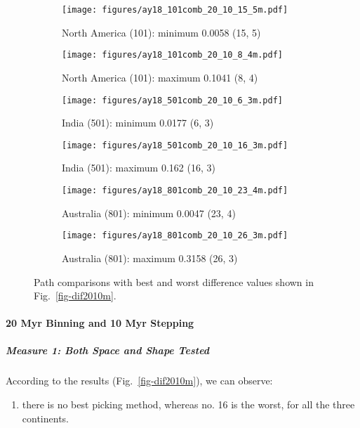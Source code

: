 \begin{figure*}
	\centering
	\begin{subfigure}{.43\textwidth}
		\texttt{[image: figures/ay18\_101comb\_20\_10\_15\_5m.pdf]}
		\caption{North America (101): minimum 0.0058 (15, 5)}\label{fig-nac-2010155m}
	\end{subfigure}
	\begin{subfigure}{.43\textwidth}
		\texttt{[image: figures/ay18\_101comb\_20\_10\_8\_4m.pdf]}
		\caption{North America (101): maximum 0.1041 (8, 4)}\label{fig-nac-201084m}
	\end{subfigure}
	\vspace{.1em}
	\begin{subfigure}{.43\textwidth}
		\texttt{[image: figures/ay18\_501comb\_20\_10\_6\_3m.pdf]}
		\caption{India (501): minimum 0.0177 (6, 3)}\label{fig-ind-201063m}
	\end{subfigure}
	\begin{subfigure}{.43\textwidth}
		\texttt{[image: figures/ay18\_501comb\_20\_10\_16\_3m.pdf]}
		\caption{India (501): maximum 0.162 (16, 3)}\label{fig-ind-2010163m}
	\end{subfigure}
	\vspace{.1em}
	\begin{subfigure}{.43\textwidth}
		\texttt{[image: figures/ay18\_801comb\_20\_10\_23\_4m.pdf]}
		\caption{Australia (801): minimum 0.0047 (23, 4)}\label{fig-au-2010234m}
	\end{subfigure}
	\begin{subfigure}{.43\textwidth}
		\texttt{[image: figures/ay18\_801comb\_20\_10\_26\_3m.pdf]}
		\caption{Australia (801): maximum 0.3158 (26, 3)}\label{fig-au-2010263m}
	\end{subfigure}
	\caption[Best and worst differences with test (20 Myr bin, 10 Myr
step)]{Path comparisons with best and worst difference values shown in
Fig.~\ref{fig-dif2010m}.}\label{fig-dif2010bwm}
\end{figure*}

\paragraph{20 Myr Binning and 10 Myr Stepping}

\subparagraph{Measure 1: Both Space and Shape Tested}

According to the results (Fig.~\ref{fig-dif2010m}), we can observe:
%
\begin{enumerate}
  \item there is no best picking method, whereas no. 16 is the worst, for all
		the three continents.
\end{enumerate}

